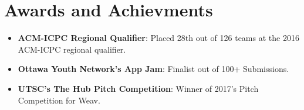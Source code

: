 \documentclass[letterpaper,11pt]{article}
\newcommand{\resumeItem}[2]{
  \item\small{
    \textbf{#1}{: #2 \vspace{-2pt}}
  }
}
\newcommand{\resumeSubItem}[2]{\resumeItem{#1}{#2}\vspace{-4pt}}
\newcommand{\resumeSubHeadingListStart}{\begin{itemize}[leftmargin=*]}
\newcommand{\resumeSubHeadingListEnd}{\end{itemize}}
\begin{document}
\section{Awards and Achievments}
\resumeSubHeadingListStart
    \resumeSubItem{ACM-ICPC Regional Qualifier}
      {Placed 28th out of 126 teams at the 2016 ACM-ICPC regional qualifier.}
    \resumeSubItem{Ottawa Youth Network's App Jam}
      {Finalist out of 100+ Submissions.}
    \resumeSubItem{UTSC's The Hub Pitch Competition}
      {Winner of 2017's Pitch Competition for Weav.}
 \resumeSubHeadingListEnd

\end{document}
